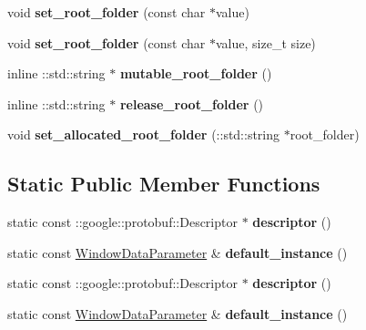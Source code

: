 \begin{DoxyCompactItemize}
void {\bfseries set\+\_\+root\+\_\+folder} (const char $\ast$value)
\item 
\mbox{\label{classcaffe_1_1_window_data_parameter_a5ebbdb9bf66ce6044cef1834176d68c6}} 
void {\bfseries set\+\_\+root\+\_\+folder} (const char $\ast$value, size\+\_\+t size)
\item 
\mbox{\label{classcaffe_1_1_window_data_parameter_a7c0bffae7ce16645fc247c1037136bc5}} 
inline \+::std\+::string $\ast$ {\bfseries mutable\+\_\+root\+\_\+folder} ()
\item 
\mbox{\label{classcaffe_1_1_window_data_parameter_a1e15beac366835f4f002cd725a274a85}} 
inline \+::std\+::string $\ast$ {\bfseries release\+\_\+root\+\_\+folder} ()
\item 
\mbox{\label{classcaffe_1_1_window_data_parameter_a55841a01ec03475588a371265c5e0f0a}} 
void {\bfseries set\+\_\+allocated\+\_\+root\+\_\+folder} (\+::std\+::string $\ast$root\+\_\+folder)
\end{DoxyCompactItemize}
\subsection*{Static Public Member Functions}
\begin{DoxyCompactItemize}
\item 
\mbox{\label{classcaffe_1_1_window_data_parameter_a9b8526d6cc3539d5fe8c9bae772db70b}} 
static const \+::google\+::protobuf\+::\+Descriptor $\ast$ {\bfseries descriptor} ()
\item 
\mbox{\label{classcaffe_1_1_window_data_parameter_a70b28c68d9937a40a6d561d07c0c3fb5}} 
static const \mbox{\hyperlink{classcaffe_1_1_window_data_parameter}{Window\+Data\+Parameter}} \& {\bfseries default\+\_\+instance} ()
\item 
\mbox{\label{classcaffe_1_1_window_data_parameter_a70729261ac886b4477a6db83e9925648}} 
static const \+::google\+::protobuf\+::\+Descriptor $\ast$ {\bfseries descriptor} ()
\item 
\mbox{\label{classcaffe_1_1_window_data_parameter_a3f2466d88f5692fb4ee6e2ad20629e9b}} 
static const \mbox{\hyperlink{classcaffe_1_1_window_data_parameter}{Window\+Data\+Parameter}} \& {\bfseries default\+\_\+instance} ()
\end{DoxyCompactItemize}
